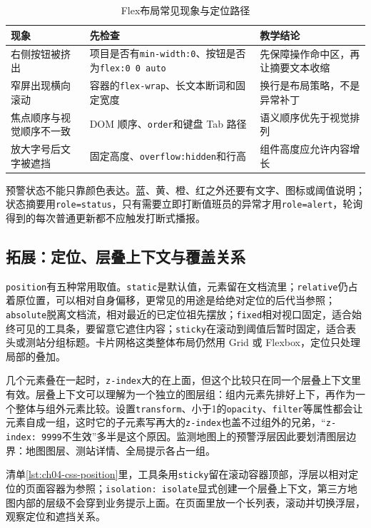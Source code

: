 \begin{table}[htbp]
\centering
\caption{Flex布局常见现象与定位路径}
\label{tab:ch04-flex-diagnostics}
\begin{tabular}{p{}p{}p{}}
\toprule
现象 & 先检查 & 教学结论 \\
\midrule
右侧按钮被挤出 & 项目是否有\texttt{min-width:0}、按钮是否为\texttt{flex:0 0 auto} & 先保障操作命中区，再让摘要文本收缩 \\
窄屏出现横向滚动 & 容器的\texttt{flex-wrap}、长文本断词和固定宽度 & 换行是布局策略，不是异常补丁 \\
焦点顺序与视觉顺序不一致 & DOM 顺序、\texttt{order}和键盘 Tab 路径 & 语义顺序优先于视觉排列 \\
放大字号后文字被遮挡 & 固定高度、\texttt{overflow:hidden}和行高 & 组件高度应允许内容增长 \\
\bottomrule
\end{tabular}
\end{table}

预警状态不能只靠颜色表达。蓝、黄、橙、红之外还要有文字、图标或阈值说明；状态摘要用\texttt{role=status}，只有需要立即打断值班员的异常才用\texttt{role=alert}，轮询得到的每次普通更新都不应触发打断式播报。

\subsection{拓展：定位、层叠上下文与覆盖关系}

\texttt{position}有五种常用取值。\texttt{static}是默认值，元素留在文档流里；\texttt{relative}仍占着原位置，可以相对自身偏移，更常见的用途是给绝对定位的后代当参照；\texttt{absolute}脱离文档流，相对最近的已定位祖先摆放；\texttt{fixed}相对视口固定，适合始终可见的工具条，要留意它遮住内容；\texttt{sticky}在滚动到阈值后暂时固定，适合表头或测站分组标题。卡片网格这类整体布局仍然用 Grid 或 Flexbox，定位只处理局部的叠加。

几个元素叠在一起时，\texttt{z-index}大的在上面，但这个比较只在同一个层叠上下文里有效。层叠上下文可以理解为一个独立的图层组：组内元素先排好上下，再作为一个整体与组外元素比较。设置\texttt{transform}、小于1的\texttt{opacity}、\texttt{filter}等属性都会让元素自成一组，这时它的子元素写再大的\texttt{z-index}也盖不过组外的兄弟，“\texttt{z-index: 9999}不生效”多半是这个原因。监测地图上的预警浮层因此要划清图层边界：地图图层、测站详情、全局提示各占一组。

清单\ref{lst:ch04-css-position}里，工具条用\texttt{sticky}留在滚动容器顶部，浮层以相对定位的页面容器为参照；\texttt{isolation: isolate}显式创建一个层叠上下文，第三方地图内部的层级不会穿到业务提示上面。在页面里放一个长列表，滚动并切换浮层，观察定位和遮挡关系。

